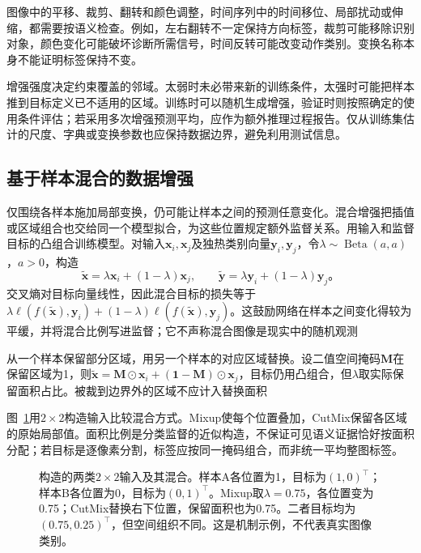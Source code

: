 图像中的平移、裁剪、翻转和颜色调整，时间序列中的时间移位、局部扰动或伸缩，都需要按语义检查。例如，左右翻转不一定保持方向标签，裁剪可能移除识别对象，颜色变化可能破坏诊断所需信号，时间反转可能改变动作类别。变换名称本身不能证明标签保持不变。

增强强度决定约束覆盖的邻域。太弱时未必带来新的训练条件，太强时可能把样本推到目标定义已不适用的区域。训练时可以随机生成增强，验证时则按照确定的使用条件评估；若采用多次增强预测平均，应作为额外推理过程报告。仅从训练集估计的尺度、字典或变换参数也应保持数据边界，避免利用测试信息。

\subsection{基于样本混合的数据增强}
\label{sec:generalization-sample-mixing}

仅围绕各样本施加局部变换，仍可能让样本之间的预测任意变化。混合增强把插值或区域组合也交给同一个模型拟合，为这些位置规定额外监督关系。用输入和监督目标的凸组合训练模型。对输入$\bm x_i,\bm x_j$及独热类别向量$\bm y_i,\bm y_j$，令$\lambda\sim\operatorname{Beta}(a,a)$，$a>0$，构造
\begin{equation}
  \tilde{\bm x}=\lambda\bm x_i+(1-\lambda)\bm x_j,\qquad
  \tilde{\bm y}=\lambda\bm y_i+(1-\lambda)\bm y_j\text{。}
  \label{eq:generalization-mixup}
\end{equation}
交叉熵对目标向量线性，因此混合目标的损失等于$\lambda\ell(f(\tilde{\bm x}),\bm y_i)+(1-\lambda)\ell(f(\tilde{\bm x}),\bm y_j)$。这鼓励网络在样本之间变化得较为平缓，并将混合比例写进监督；它不声称混合图像是现实中的随机观测

从一个样本保留部分区域，用另一个样本的对应区域替换。设二值空间掩码$\bm M$在保留区域为1，则$\tilde{\bm x}=\bm M\odot\bm x_i+(\bm1-\bm M)\odot\bm x_j$，目标仍用凸组合，但$\lambda$取实际保留面积占比。被裁到边界外的区域不应计入替换面积

图~\ref{fig:generalization-mixing}用$2\times2$构造输入比较混合方式。Mixup使每个位置叠加，CutMix保留各区域的原始局部值。面积比例是分类监督的近似构造，不保证可见语义证据恰好按面积分配；若目标是逐像素分割，标签应按同一掩码组合，而非统一平均整图标签。
\begin{figure}[htbp]
  \centering
  
  \caption{构造的两类$2\times2$输入及其混合。样本A各位置为1，目标为$(1,0)^{\top}$；样本B各位置为0，目标为$(0,1)^{\top}$。Mixup取$\lambda=0.75$，各位置变为0.75；CutMix替换右下位置，保留面积也为0.75。二者目标均为$(0.75,0.25)^{\top}$，但空间组织不同。这是机制示例，不代表真实图像类别。}
  \label{fig:generalization-mixing}
\end{figure}

